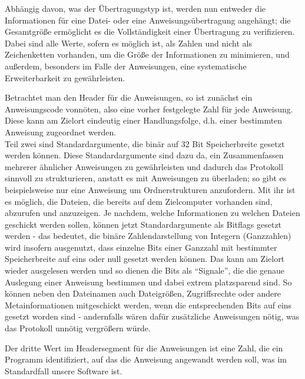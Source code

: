 Abhängig davon, was der Übertragungstyp ist, werden nun entweder die Informationen für eine Datei- oder eine Anweisungsübertragung angehängt; die Gesamtgröße ermöglicht es die Vollständigkeit einer Übertragung zu verifizieren.
Dabei sind alle Werte, sofern es möglich ist, als Zahlen und nicht als Zeichenketten vorhanden, um die Größe der Informationen zu minimieren, und außerdem, besonders im Falle der Anweisungen, eine systematische Erweiterbarkeit zu gewährleisten.\\\par
Betrachtet man den Header für die Anweisungen, so ist zunächst ein Anweisungscode vonnöten, also eine vorher festgelegte Zahl für jede Anweisung.
Diese kann am Zielort eindeutig einer Handlungsfolge, d.h. einer bestimmten Anweisung zugeordnet werden.\\
Teil zwei sind Standardargumente, die binär auf 32 Bit Speicherbreite gesetzt werden können.
Diese Standardargumente sind dazu da, ein Zusammenfassen mehrerer ähnlicher Anweisungen zu gewährleisten und dadurch das Protokoll sinnvoll zu strukturieren, anstatt es mit Anweisungen zu überladen; so gibt es beispielsweise nur eine Anweisung um Ordnerstrukturen anzufordern.  
Mit ihr ist es möglich, die Dateien, die bereits auf dem Zielcomputer vorhanden sind, abzurufen und anzuzeigen. 
Je nachdem, welche Informationen zu welchen Dateien geschickt werden sollen, können jetzt Standardargumente als Bitflags gesetzt werden -  das bedeutet, die binäre Zahlendarstellung von Integern (Ganzzahlen) wird insofern ausgenutzt, dass einzelne Bits einer Ganzzahl mit bestimmter Speicherbreite auf eins oder null gesetzt werden können. Das kann am Zielort wieder ausgelesen werden und so dienen die Bits als "`Signale"', die die genaue Auslegung einer Anweisung bestimmen und dabei extrem platzsparend sind.
So können neben den Datei\-namen auch Dateigrößen, Zugriffsrechte oder andere Metainformationen mitgeschickt werden, wenn die entsprechenden Bits auf eins gesetzt worden sind - andernfalls wären dafür zusätzliche Anweisungen nötig, was das Protokoll unnötig vergrößern würde.\par
Der dritte Wert im Headersegment für die Anweisungen ist eine Zahl, die ein Programm identifiziert, auf das die Anweisung angewandt werden soll, was im Standardfall unsere Software ist.

